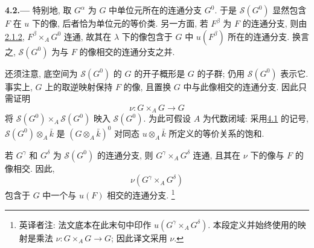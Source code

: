 
\medskip
{}\label{par:sga3-VIA-4.2}%
\noindent\textbf{4.2.---}
特别地, 取 \(G^\alpha\) 为 \(G\) 中单位元所在的连通分支 \(G^0\).
于是 \(\mathscr S(G^0)\) 显然包含 \(F\) 在 \(u\) 下的像,
后者恰为单位元的等价类.
另一方面, 若 \(F^\beta\) 为 \(F\) 的连通分支,
则由\hyperref[lem:sga3-VIA-2.1.2]{2.1.2}, \(F^\beta\times_A G^0\) 连通,
故其在 \(\lambda\) 下的像包含于 \(G\) 中 \(u(F^\beta)\) 所在的连通分支.
换言之, \(\mathscr S(G^0)\) 为与 \(F\) 的像相交的连通分支之并.

还须注意, 底空间为 \(\mathscr S(G^0)\) 的 \(G\) 的开子概形是 \(G\) 的子群;
仍用 \(\mathscr S(G^0)\) 表示它.
事实上, \(G\) 上的取逆映射保持 \(F\) 的像,
且置换 \(G\) 中与此像相交的连通分支. 因此只需证明
\[
  \nu:G\times_A G\longrightarrow G
\]
将 \(\mathscr S(G^0)\times_A\mathscr S(G^0)\) 映入 \(\mathscr S(G^0)\).
为此可假设 \(A\) 为代数闭域:
采用\hyperref[par:sga3-VIA-4.1]{4.1} 的记号,
\(\mathscr S(G^0)\otimes_A\bar k\) 是 \((G\otimes_A\bar k)^0\)
对同态 \(u\otimes_A\bar k\) 所定义的等价关系的饱和.

若 \(G^\gamma\) 和 \(G^\delta\) 为 \(\mathscr S(G^0)\) 的连通分支,
则 \(G^\gamma\times_A G^\delta\) 连通, 且其在 \(\nu\) 下的像与 \(F\) 的像相交.
因此,
\[
  \nu(G^\gamma\times_A G^\delta)
\]
包含于 \(G\) 中一个与 \(u(F)\) 相交的连通分支.\begingroup
\renewcommand{\thefootnote}{\fnsymbol{footnote}}%
\footnote[1]{英译者注: 法文底本在此末句中印作 \(u(G^\gamma\times_A G^\delta)\).
本段定义并始终使用的映射是乘法 \(\nu:G\times_A G\to G\);
因此译文采用 \(\nu\).}%
\endgroup
